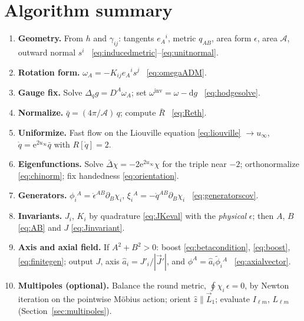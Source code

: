 \documentclass[11pt]{article}
\newcommand{\dd}{\mathrm{d}}
\newcommand{\ee}{\mathrm{e}}
\newcommand{\qo}{\mathring{q}}          %
\newcommand{\epso}{\mathring{\epsilon}} %
\newcommand{\vJ}{\vec{J}}
\begin{document}
\section{Algorithm summary}
\label{sec:summary}

\begin{enumerate}
\item \textbf{Geometry.}  From $h$ and $\gamma_{ij}$: tangents $e_A{}^i$,
  metric $q_{AB}$, area form $\epsilon$, area $\mathcal{A}$, outward normal
  $s^i$ \ \eqref{eq:inducedmetric}--\eqref{eq:unitnormal}.
\item \textbf{Rotation form.}  $\omega_A = -K_{ij}e_A{}^i s^j$
  \ \eqref{eq:omegaADM}.
\item \textbf{Gauge fix.}  Solve $\Delta_q g = D^A\omega_A$; set
  $\omega^{\mathrm{inv}} = \omega - \dd g$ \ \eqref{eq:hodgesolve}.
\item \textbf{Normalize.}  $\bar q = (4\pi/\mathcal{A})\,q$; compute
  $\bar R$ \ \eqref{eq:Reth}.
\item \textbf{Uniformize.}  Fast flow on the Liouville equation
  \eqref{eq:liouville} $\to u_\infty$,
  $\qo = \ee^{2u_\infty}\bar q$ with $R[\qo]=2$.
\item \textbf{Eigenfunctions.}  Solve
  $\bar\Delta\chi = -2\ee^{2u_\infty}\chi$ for the triple near $-2$;
  orthonormalize \eqref{eq:chinorm}; fix handedness \eqref{eq:orientation}.
\item \textbf{Generators.}  $\phi_i{}^A = \epso^{AB}\partial_B\chi_i$,
  $\xi_i{}^A = -\qo^{AB}\partial_B\chi_i$ \ \eqref{eq:generatorscov}.
\item \textbf{Invariants.}  $J_i$, $K_i$ by quadrature \eqref{eq:JKeval}
  with the \emph{physical} $\epsilon$; then $A$, $B$ \eqref{eq:AB} and
  $J$ \eqref{eq:Jinvariant}.
\item \textbf{Axis and axial field.}  If $A^2+B^2>0$: boost
  \eqref{eq:betacondition}, \eqref{eq:boost}, \eqref{eq:finitegen}; output
  $J$, axis $\hat a_i = J'_i/|\vJ'|$, and
  $\phi^A = \hat a_i\tilde\phi_i{}^A$ \ \eqref{eq:axialvector}.
\item \textbf{Multipoles (optional).}  Balance the round metric,
  $\oint\chi_i\,\epsilon = 0$, by Newton iteration on the pointwise M\"obius
  action; orient $\hat z\parallel\vec L_1$; evaluate $I_{\ell m}$,
  $L_{\ell m}$ (Section~\ref{sec:multipoles}).
\end{enumerate}

\end{document}
